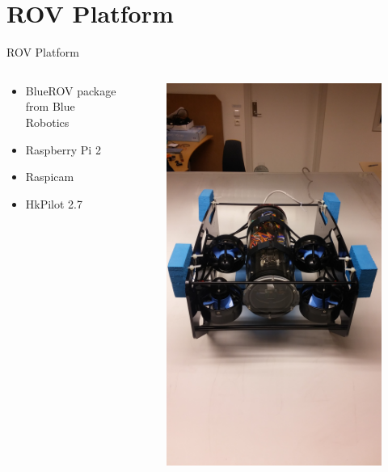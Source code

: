 \documentclass[11pt,aspectratio=169]{beamer}
\begin{document}
\section{ROV Platform}
\begin{frame}{ROV Platform}
\begin{columns}
\begin{column}{0.5\textwidth}
\begin{itemize}
\item BlueROV package from Blue Robotics
\item Raspberry Pi 2
\item Raspicam
\item HkPilot 2.7
\end{itemize}
\end{column}
\begin{column}{0.5\textwidth}
\begin{figure}
\includegraphics[trim={40cm 0cm 45cm 0cm},clip,angle=270,width=\textwidth]{fig/bluerov}
\end{figure}
\end{column}
\end{columns}


\end{frame}
\end{document}
